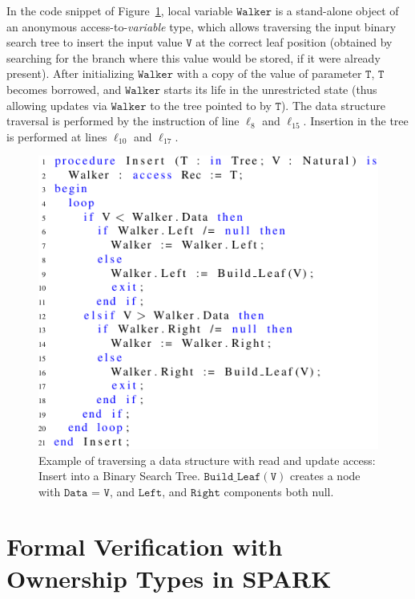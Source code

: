 \documentclass[runningheads]{llncs}
\newcommand\var[1]{\ensuremath{\mathtt{#1}}}
\begin{document}
In the code snippet of Figure~\ref{fig:treeInsert}, local variable \var{Walker} is a stand-alone object of an anonymous access-to-\textit{variable} type, which allows traversing the input binary
search tree to insert the input value \var{V} at the correct leaf position (obtained by searching for the branch where this value would be stored, if it were already present).
After initializing \var{Walker} with a copy of the value of parameter \var{T}, \var{T} becomes borrowed, and \var{Walker} starts its life in the unrestricted state (thus allowing updates via \var{Walker} to the tree pointed to by \var{T}).
The data structure traversal is performed by the instruction of line $\ell_8$ and $\ell_{15}$. Insertion in the tree is performed at lines
$\ell_{10}$ and $\ell_{17}$.


\begin{figure}[htb!]
\centering
  \captionsetup{justification=centering,margin=0.6cm}
   \includegraphics[]{treeInsert}
   \caption{Example of traversing a data structure with read and  update access: Insert into a Binary Search Tree. \var{Build\_Leaf(V)} creates a node with \var{Data} = \var{V}, and \var{Left}, and \var{Right} components both null.}
   \label{fig:treeInsert}
\end{figure}


\section{Formal Verification with Ownership Types in SPARK}
\label{sec:ownership-SPARK}
\end{document}
